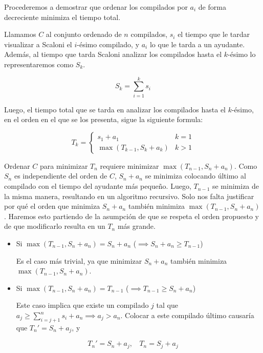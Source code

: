 Procederemos a demostrar que ordenar los compilados por $a_i$ de forma decreciente minimiza el tiempo total.

Llamamos $C$ al conjunto ordenado de $n$ compilados, $s_i$ el tiempo que le tardar visualizar a Scaloni el $i$-ésimo compilado, y
$a_i$ lo que le tarda a un ayudante. Además, al tiempo que tarda Scaloni analizar los compilados hasta el $k$-ésimo lo representaremos como $S_k$.

$$
S_{k}=\sum_{i=1}^{k}s_{i} 
$$

Luego, el tiempo total que se tarda en analizar los compilados hasta el $k$-ésimo, en el orden
en el que se los presenta, sigue la siguiente formula:


$$
T_{k} = \begin{cases}
s_{1}+a_{1} & k=1 \\
\displaystyle\max{(T_{k-1},S_{k}+a_{k})} & k>1
\end{cases}
$$

Ordenar $C$ para minimizar $T_{n}$ requiere minimizar $\max{(T_{n-1},S_{n}+a_{n})}$. Como $S_{n}$ es independiente del orden de $C$, $S_{n}+a_{n}$ se minimiza colocando último al compilado con el tiempo del ayudante más pequeño. Luego, $T_{n-1}$ se minimiza de la misma manera, resultando en un algoritmo recursivo. Solo nos falta justificar por qué el orden que minimiza $S_{n}+a_{n}$ también minimiza $\max{(T_{n-1},S_{n}+a_{n})}$. Haremos esto partiendo de la asumpción de que se respeta el orden propuesto y de que modificarlo resulta en un $T_n$ más grande.

\begin{itemize}

    \item Si $\max{(T_{n-1},S_{n}+a_{n})} = S_{n}+a_{n}$ ($\implies S_{n}+a_{n} \geq T_{n-1}$)

    Es el caso más trivial, ya que minimizar $S_{n}+a_{n}$ también minimiza $\max{(T_{n-1},S_{n}+a_{n})}$.

    \item Si $\max{(T_{n-1},S_{n}+a_{n})} = T_{n-1}$ ($\implies T_{n-1} \geq S_{n}+a_{n}$)

    Este caso implica que existe un compilado $j$ tal que $a_{j} \geq \sum^{n}_{i=j+1}s_{i}+a_{n} \implies a_{j} > a_{n}$.
    Colocar a este compilado último causaría que $T_{n}'= S_{n}+a_{j}$, y

\end{itemize}

$$
T_{n}' = S_{n}+a_{j}, \ \ \ \  T_{n} = S_{j}+a_{j} 
$$

